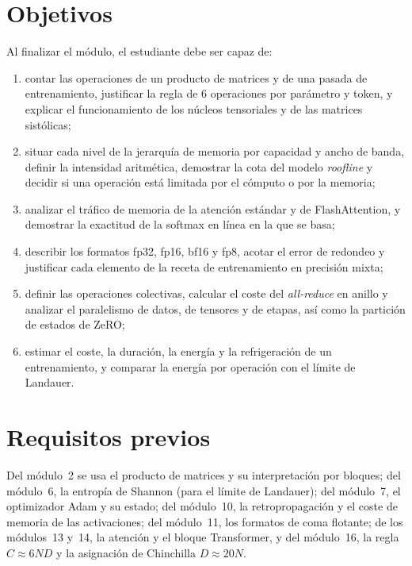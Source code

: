 \documentclass[11pt,a4paper,twoside,openany]{book}
\begin{document}
\section*{Objetivos}
Al finalizar el módulo, el estudiante debe ser capaz de:
\begin{enumerate}[label=\arabic*.]
  \item contar las operaciones de un producto de matrices y de una pasada de entrenamiento, justificar la regla de $6$ operaciones por parámetro y token, y explicar el funcionamiento de los núcleos tensoriales y de las matrices sistólicas;
  \item situar cada nivel de la jerarquía de memoria por capacidad y ancho de banda, definir la intensidad aritmética, demostrar la cota del modelo \emph{roofline} y decidir si una operación está limitada por el cómputo o por la memoria;
  \item analizar el tráfico de memoria de la atención estándar y de FlashAttention, y demostrar la exactitud de la softmax en línea en la que se basa;
  \item describir los formatos fp32, fp16, bf16 y fp8, acotar el error de redondeo y justificar cada elemento de la receta de entrenamiento en precisión mixta;
  \item definir las operaciones colectivas, calcular el coste del \emph{all-reduce} en anillo y analizar el paralelismo de datos, de tensores y de etapas, así como la partición de estados de ZeRO;
  \item estimar el coste, la duración, la energía y la refrigeración de un entrenamiento, y comparar la energía por operación con el límite de Landauer.
\end{enumerate}

\section*{Requisitos previos}
Del módulo~2 se usa el producto de matrices y su interpretación por bloques; del módulo~6, la entropía de Shannon (para el límite de Landauer); del módulo~7, el optimizador Adam y su estado; del módulo~10, la retropropagación y el coste de memoria de las activaciones; del módulo~11, los formatos de coma flotante; de los módulos~13 y~14, la atención y el bloque Transformer, y del módulo~16, la regla $C\approx 6ND$ y la asignación de Chinchilla $D\approx 20N$.
\end{document}
